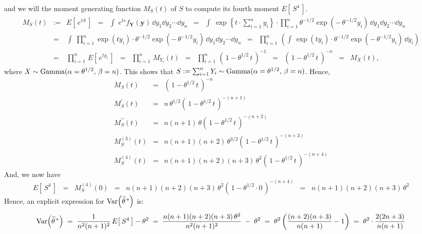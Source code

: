 and we will the moment  generating function $M_{S}(t)$ of $S$ to compute its fourth moment $E\!\left[\,S^{4}\,\right]$.
\begin{eqnarray*}
M_{S}(t)
&:=& E\!\left[\,e^{tS}\,\right]
\;\; = \;\; \int\;e^{ts}f_{\mathbf{Y}}(\mathbf{y})\,\dd y_{1} \dd y_{2} \cdots \dd y_{n}
\;\; = \;\; \int\;\exp\left\{t\cdot\sum_{i=1}^{n}y_{i}\right\}\cdot\prod_{i=1}^{n}\theta^{-1/2}\exp(-\,\theta^{-1/2}y_{i})\,\dd y_{1} \dd y_{2} \cdots \dd y_{n} \\
&=& \int\;\prod_{i=1}^{n}\exp(ty_{i})\cdot\theta^{-1/2}\exp(-\,\theta^{-1/2}y_{i})\,\dd y_{1} \dd y_{2} \cdots \dd y_{n}
\;\;=\;\; \prod_{i=1}^{n}\,\left(\int\,\exp(ty_{i})\cdot\theta^{-1/2}\exp(-\,\theta^{-1/2}y_{i})\,\dd y_{i}\right) \\
&=& \prod_{i=1}^{n}\,E\!\left[\,e^{ty_{i}}\,\right]
\;\;=\;\; \prod_{i=1}^{n}\,M_{Y_{i}}(t)
\;\;=\;\; \prod_{i=1}^{n}\,\left(\,1-\theta^{1/2}\,t\,\right)^{-1}
\;\;=\;\; \left(\,1-\theta^{1/2}\,t\,\right)^{-n}
\;\;=\;\; M_{X}(t),
\end{eqnarray*}
where $X \sim \textnormal{Gamma}(\alpha = \theta^{1/2},\,\beta = n)$.
This shows that $S := \sum_{i=1}^{n}Y_{i} \sim \textnormal{Gamma}(\alpha = \theta^{1/2},\,\beta = n)$.
Hence,
\begin{eqnarray*}
M_{S}(t) & = & \left(\,1 - \theta^{1/2}\,t\,\right)^{-n} \\
M^{\prime}_{S}(t) & = & n\,\theta^{1/2}\left(\,1 - \theta^{1/2}\,t\,\right)^{-(n+1)} \\
M^{\prime\prime}_{S}(t) & = & n(n+1)\,\theta\left(\,1 - \theta^{1/2}\,t\,\right)^{-(n+2)} \\
M^{(3)}_{S}(t) & = & n(n+1)(n+2)\,\theta^{3/2}\left(\,1 - \theta^{1/2}\,t\,\right)^{-(n+3)} \\
M^{(4)}_{S}(t) & = & n(n+1)(n+2)(n+3)\,\theta^{2}\left(\,1 - \theta^{1/2}\,t\,\right)^{-(n+4)}
\end{eqnarray*}
And, we now have
\begin{equation*}
E\!\left[\,S^{4}\,\right]
\;\; = \;\; M^{(4)}_{S}(0)
\;\; = \;\; n(n+1)(n+2)(n+3)\,\theta^{2}\left(\,1 - \theta^{1/2}\cdot 0\,\right)^{-(n+4)}
\;\; = \;\; n(n+1)(n+2)(n+3)\,\theta^{2}
\end{equation*}
Hence, an explicit expression for $\textnormal{Var}\!\left(\widehat{\theta}^{\,*}\right)$ is:
\begin{equation*}
\textnormal{Var}\!\left(\widehat{\theta}^{\,*}\right)
\; = \; \frac{1}{n^{2}(n+1)^{2}}\,E\!\left[\,S^{4}\,\right] - \theta^{2}
\; = \; \frac{n(n+1)(n+2)(n+3)\,\theta^{2}}{n^{2}(n+1)^{2}} \; - \; \theta^{2}
\; = \; \theta^{2}\left(\frac{(n+2)(n+3)}{n(n+1)} - 1\right)
\; = \; \theta^{2}\cdot\frac{2(2n+3)}{n(n+1)}
\end{equation*}

